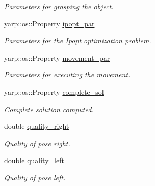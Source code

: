 \begin{DoxyCompactItemize}
\begin{DoxyCompactList}\small\item\em Parameters for grasping the object. \end{DoxyCompactList}\item 
yarp\+::os\+::\+Property \hyperlink{classGraspingModule_af17896b5afa9de9dbd63caf2bf4e2deb}{ipopt\+\_\+par}\label{classGraspingModule_af17896b5afa9de9dbd63caf2bf4e2deb}

\begin{DoxyCompactList}\small\item\em Parameters for the Ipopt optimization problem. \end{DoxyCompactList}\item 
yarp\+::os\+::\+Property \hyperlink{classGraspingModule_a7da5cb35f5a34a18b68023c3d1d3f276}{movement\+\_\+par}\label{classGraspingModule_a7da5cb35f5a34a18b68023c3d1d3f276}

\begin{DoxyCompactList}\small\item\em Parameters for executing the movement. \end{DoxyCompactList}\item 
yarp\+::os\+::\+Property \hyperlink{classGraspingModule_af0bdebfd4648ff04bcaf790879897743}{complete\+\_\+sol}\label{classGraspingModule_af0bdebfd4648ff04bcaf790879897743}

\begin{DoxyCompactList}\small\item\em Complete solution computed. \end{DoxyCompactList}\item 
double \hyperlink{classGraspingModule_aca01f7f0ec39c36623700330b632109f}{quality\+\_\+right}\label{classGraspingModule_aca01f7f0ec39c36623700330b632109f}

\begin{DoxyCompactList}\small\item\em Quality of pose right. \end{DoxyCompactList}\item 
double \hyperlink{classGraspingModule_a6f5ca6d1a1e4efceb05d32fb9c0e10ad}{quality\+\_\+left}\label{classGraspingModule_a6f5ca6d1a1e4efceb05d32fb9c0e10ad}

\begin{DoxyCompactList}\small\item\em Quality of pose left. \end{DoxyCompactList}\end{DoxyCompactItemize}


